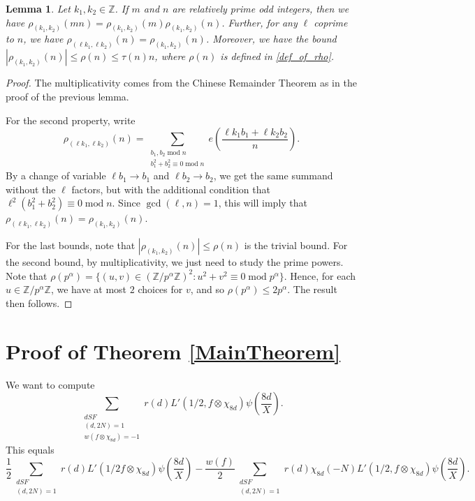 \documentclass[12pt]{amsart}
\def\Z{\mathbb{Z}}
\newtheorem{lemma}[theorem]{Lemma}
\def\Z{\mathbb Z}
\def\Z{\mathbb Z}
\def\mod{\operatorname{mod}}
\def\gcd{\operatorname{gcd}}
\begin{document}
\begin{lemma}\label{Properties of rho}
    Let $k_1, k_2\in \Z$. If $m$ and $n$ are relatively prime odd integers, then we have $\rho_{(k_1,k_2)}(mn)= \rho_{(k_1,k_2)}(m)\rho_{(k_1,k_2)}(n)$. Further, for any $\ell$ coprime to $n$, we have $\rho_{(\ell k_1 , \ell k_2)}(n) = \rho_{(k_1,k_2)}(n)$. Moreover, we have the bound $|\rho_{(k_1,k_2)}(n)| \leq \rho(n) \leq \tau(n) n$, where $\rho(n)$ is defined in \eqref{def_of_rho}.
\end{lemma}
\begin{proof}
    The multiplicativity comes from the Chinese Remainder Theorem as in the proof of the previous lemma.
    
    For the second property, write
    $$ \rho_{(\ell k_1 , \ell k_2)}(n) = \sum_{\substack{b_1, b_2 \mod n \\ b_1^2+b_2^2 \equiv 0 \mod n}} e\left( \frac{\ell k_1 b_1+ \ell k_2 b_2}{n} \right).$$
    By a change of variable $\ell b_1 \to b_1$ and $\ell b_2 \to b_2$, we get the same summand without the $\ell$ factors, but with the additional condition that $\ell^2(b_1^2+b_2^2) \equiv 0 \mod n$. Since $\gcd(\ell,n)=1$, this will imply that $\rho_{(\ell k_1 , \ell k_2)}(n) = \rho_{(k_1,k_2)}(n)$.
    
    For the last bounds, note that $|\rho_{(k_1,k_2)}(n)| \leq \rho(n)$ is the trivial bound. For the second bound, by multiplicativity, we just need to study the prime powers. Note that $\rho(p^{\alpha}) = \{(u,v)\in (\Z/p^{\alpha}\Z)^2 : u^2+v^2 \equiv 0 \mod p^{\alpha} \}$. Hence, for each $u\in \Z/p^{\alpha}\Z$, we have at most $2$ choices for $v$, and so $\rho(p^{\alpha}) \leq 2p^{\alpha}$. The result then follows.
\end{proof}


\section{Proof of Theorem \ref{MainTheorem}}

We want to compute
\[\sum_{\substack{d SF\\(d,2N)=1\\w(f\otimes \chi_{8d})=-1}}r(d)L'(1/2,f\otimes\chi_{8d})\psi\left(\frac{8d}{X}\right).\]
This equals
\[\frac{1}{2}\sum_{\substack{d SF\\(d,2N)=1}}r(d)L'(1/2f\otimes\chi_{8d})\psi\left(\frac{8d}{X}\right)-\frac{w(f)}{2}\sum_{\substack{d SF\\(d,2N)=1}}r(d)\chi_{8d}(-N)L'(1/2,f\otimes\chi_{8d})\psi\left(\frac{8d}{X}\right).\]
\end{document}
